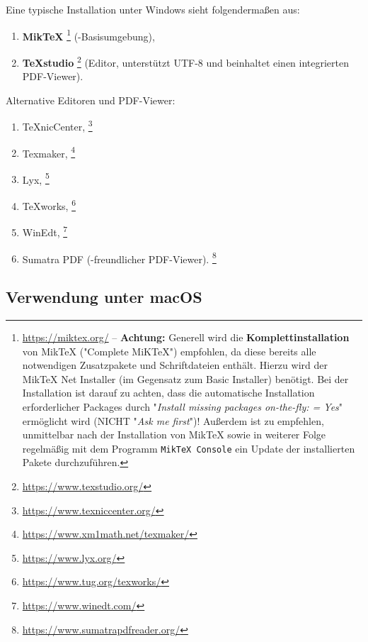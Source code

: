 Eine typische Installation unter Windows sieht folgendermaßen aus:
%
\begin{enumerate}
\item \textbf{MikTeX}%
	\footnote{\url{https://miktex.org/} -- \textbf{Achtung:}
	Generell wird die \textbf{Komplettinstallation} von MikTeX ("Complete
	MiKTeX") empfohlen, da diese bereits alle notwendigen Zusatzpakete und
	Schriftdateien enthält. Hierzu wird der MikTeX Net Installer (im Gegensatz
	zum Basic Installer) benötigt. Bei der Installation ist darauf zu achten,
	dass die automatische Installation erforderlicher Packages durch
	"\emph{Install missing packages on-the-fly: = Yes}" ermöglicht wird
	(NICHT "\emph{Ask me first}")! Außerdem ist zu empfehlen, unmittelbar
	nach der Installation von MikTeX sowie in weiterer Folge regelmäßig
	mit dem Programm \texttt{MikTeX Console} ein Update der installierten
	Pakete durchzuführen.} (\latex-Basisumgebung),
\item \textbf{TeXstudio}%
	\footnote{\url{https://www.texstudio.org/}}
	(Editor, unterstützt UTF-8 und beinhaltet einen integrierten PDF-Viewer).
\end{enumerate}
%
Alternative Editoren und PDF-Viewer:
%
\begin{enumerate}
	\item TeXnicCenter,%
	\footnote{\url{https://www.texniccenter.org/}}
	\item Texmaker,%
	\footnote{\url{https://www.xm1math.net/texmaker/}}
	\item Lyx,%
	\footnote{\url{https://www.lyx.org/}}
	\item TeXworks,%
	\footnote{\url{https://www.tug.org/texworks/}}
	\item WinEdt,%
	\footnote{\url{https://www.winedt.com/}}
	\item Sumatra PDF (\latex-freundlicher PDF-Viewer).%
	\footnote{\url{https://www.sumatrapdfreader.org/}}
\end{enumerate}

\subsection{Verwendung unter macOS}

